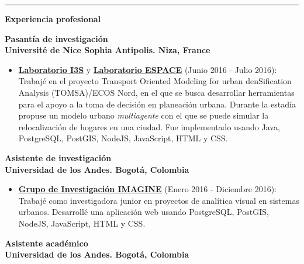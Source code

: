 \documentclass[10pt]{article}
\begin{document}
\vspace{0.25cm}
\hrule
\vspace{0.25cm}

{\large \textbf{Experiencia profesional}}
{\footnotesize
\begin{multicols}{2}
{\bf Pasantía de investigación} \\ {\bf Université de Nice Sophia Antipolis. Niza, France}
\end{multicols}

\begin{itemize}
	\item \textcolor{blue}{\href{http://www.i3s.unice.fr/fr/presentation}{\underline{\textbf{Laboratorio I3S}}}} y \textcolor{blue}{\href{http://www.umrespace.org/?lang=fr}{\underline{\textbf{Laboratorio ESPACE}}}} (Junio 2016 - Julio 2016): Trabajé en el proyecto Transport Oriented Modeling for urban denSification Analysis (\textsc{TOMSA})/ECOS Nord, en el que se busca desarrollar herramientas para el apoyo a la toma de decisión en planeación urbana. Durante la estadía propuse un modelo urbano \textit{multiagente} con el que se puede simular la relocalización de hogares en una ciudad. Fue implementado usando Java, PostgreSQL, PostGIS, NodeJS, JavaScript, HTML y CSS.

\end{itemize}
\begin{multicols}{2}
{\bf Asistente de investigación} \\ {\bf Universidad de los Andes. Bogotá, Colombia}
\end{multicols}

\begin{itemize}
	\item \textcolor{blue}{\href{http://imagine.uniandes.edu.co}{\underline{\textbf{Grupo de Investigación IMAGINE}}}} (Enero 2016 - Diciembre 2016): Trabajé como investigadora junior en proyectos de analítica visual en sistemas urbanos. Desarrollé una aplicación web usando PostgreSQL, PostGIS, NodeJS, JavaScript, HTML y CSS.
\end{itemize}

 \begin{multicols}{2}
{\bf Asistente académico} \\ {\bf Universidad de los Andes. Bogotá, Colombia}
\end{multicols}

}
\end{document}
